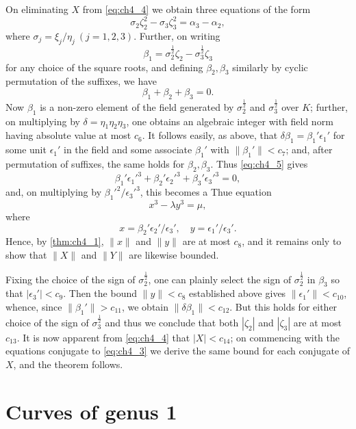 On eliminating $X$ from \eqref{eq:ch4_4} we obtain three equations of the form
\[
\sigma_2 \zeta_2^2 - \sigma_3 \zeta_3^2 = \alpha_3 - \alpha_2,
\]
where $\sigma_j = \xi_j/\eta_j \ (j = 1, 2, 3)$. Further, on writing
\[
\beta_1 = \sigma_2^{\frac{1}{2}} \zeta_2 - \sigma_3^{\frac{1}{2}} \zeta_3
\]
for any choice of the square roots, and defining $\beta_2, \beta_3$ similarly by cyclic permutation of the suffixes, we have
\begin{equation} \label{eq:ch4_5}\tag{5}
\beta_1 + \beta_2 + \beta_3 = 0.
\end{equation}
Now $\beta_1$ is a non-zero element of the field generated by $\sigma_2^{\frac{1}{2}}$ and $\sigma_3^{\frac{1}{2}}$ over $K$; further, on multiplying by $\delta = \eta_1 \eta_2 \eta_3$, one obtains an algebraic integer with field norm having absolute value at most $c_6$. It follows easily, as above, that $\delta \beta_1 = \beta_1' \epsilon_1'$ for some unit $\epsilon_1'$ in the field and some associate $\beta_1'$ with $\|\beta_1'\| < c_7$; and, after permutation of suffixes, the same holds for $\beta_2, \beta_3$. Thus \eqref{eq:ch4_5} gives
\[
\beta_1' \epsilon_1'^3 + \beta_2' \epsilon_2'^3 + \beta_3' \epsilon_3'^3 = 0,
\]
and, on multiplying by $\beta_1'^2 / \epsilon_3'^3$, this becomes a Thue equation
\[
x^3 - \lambda y^3 = \mu,
\]
where
\[
x = \beta_2' \epsilon_2' / \epsilon_3', \quad y = \epsilon_1' / \epsilon_3'.
\]
Hence, by \autoref{thm:ch4_1}, $\|x\|$ and $\|y\|$ are at most $c_8$, and it remains only to show that $\|X\|$ and $\|Y\|$ are likewise bounded.

Fixing the choice of the sign of $\sigma_2^{\frac{1}{2}}$, one can plainly select the sign of $\sigma_2^{\frac{1}{2}}$ in $\beta_3$ so that $|\epsilon_3'| < c_9$. Then the bound $\|y\| < c_8$ established above gives $\|\epsilon_1'\| < c_{10}$, whence, since $\|\beta_1'\| > c_{11}$, we obtain $\|\delta \beta_1\| < c_{12}$. But this holds for either choice of the sign of $\sigma_3^{\frac{1}{2}}$ and thus we conclude that both $|\zeta_2|$ and $|\zeta_3|$ are at most $c_{13}$. It is now apparent from \eqref{eq:ch4_4} that $|X| < c_{14}$; on commencing with the equations conjugate to \eqref{eq:ch4_3} we derive the same bound for each conjugate of $X$, and the theorem follows.

\section{Curves of genus 1}\label{sec:ch4_4}

